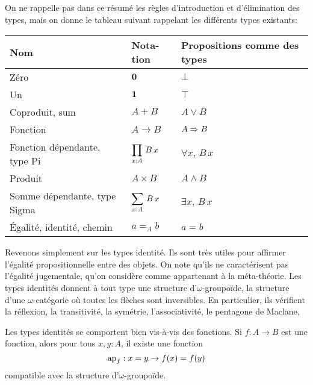 \begin{otherlanguage}{french}
On ne rappelle pas dans ce résumé les règles d'introduction et
d'élimination des types, mais on donne le tableau suivant rappelant
les différents types existants:

\renewcommand{\arraystretch}{2}
\begin{tabular}{|l|l|l|}
  \hline
  Nom & Notation & Propositions comme des types \\
  \hline\hline
  Zéro & $\displaystyle{\mathbf{0}}$ & $\displaystyle{\bot}$ \\
  \hline
  Un & $\displaystyle{\mathbf{1}}$ & $\displaystyle{\top}$ \\
  \hline
  Coproduit, sum & $\displaystyle{A+B}$ & $\displaystyle{A\lor B}$ \\
  \hline
  Fonction & $\displaystyle{A\to B}$ & $\displaystyle{A\Rightarrow B}$ \\
  \hline
  Fonction dépendante, type Pi & $\displaystyle{\prod_{x:A}\, B\, x}$ & $\displaystyle{\forall x,\,
                                                       B\, x}$ \\
  \hline
  Produit & $\displaystyle{A\times B}$ & $\displaystyle{A\land B}$ \\
  \hline
  Somme dépendante, type Sigma & $\displaystyle{\sum_{x:A}\, B\, x}$ & $\displaystyle{\exists x,\, B\,
                                                    x}$ \\
  \hline
  Égalité, identité, chemin & $\displaystyle{a =_A b}$ & $\displaystyle{a = b}$
  \\
  \hline
\end{tabular}
\renewcommand{\arraystretch}{1}

Revenons simplement sur les types identité. Ils sont très utiles pour
affirmer l'égalité propositionnelle entre des objets. On note qu'ils
ne caractérisent pas l'égalité jugementale, qu'on considère comme
appartenant à la méta-théorie. Les types identités donnent à tout type
une structure d'$\omega$-groupoïde, \ie{} la structure d'une
$\omega$-catégorie où toutes les flèches sont inversibles. En
particulier, ils vérifient la réflexion, la transitivité, la symétrie,
l'associativité, le pentagone de Maclane, \etc{}

Les types identités se comportent bien vis-à-vis des fonctions. Si
$f:A\to B$ est une fonction, alors pour tous $x,y:A$, il existe une
fonction 
\[\mathrm{ap}_{f}: x=y \to f(x) = f(y)\]
compatible avec la structure d'$\omega$-groupoïde. 


\end{otherlanguage}
